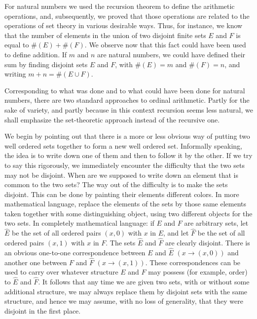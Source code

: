 
For natural numbers we used the recursion theorem to define the arithmetic operations, and, subsequently, we proved that those operations are related to the operations of set theory in various desirable ways. Thus, for instance, we know that the number of elements in the union of two disjoint finite sets $E$ and $F$ is equal to $\# (E) + \# (F)$. We observe now that this fact could have been used to define addition. If $m$ and $n$ are natural numbers, we could have defined their sum by finding disjoint sets $E$ and $F$, with $\# (E) = m$ and $\# (F) = n$, and writing $m+ n = \# (E \cup F)$.

Corresponding to what was done and to what could have been done for natural numbers, there are two standard approaches to ordinal arithmetic. Partly for the sake of variety, and partly because in this context recursion seems less natural, we shall emphasize the set-theoretic approach instead of the recursive one. 

We begin by pointing out that there is a more or less obvious way of putting two well ordered sets together to form a new well  ordered set. Informally speaking, the idea is to write down one of them and then to follow it by the other. If we try to say this rigorously, we immediately encounter the difficulty that the two sets may not be disjoint. When are we supposed to write down an element that is common to the two sets? The way out of the difficulty is to make the sets disjoint. This can be done by painting their elements different colors. In more mathematical language, replace the elements of the sets by those same elements taken together with some distinguishing object, using two different objects for the two sets. In completely mathematical language: if $E$ and $F$ are arbitrary sets, let $\hat{E}$ be the set of all ordered pairs $(x, 0)$ with $x$ in $E$, and let $\hat{F}$ be the set of all ordered pairs $(x,1)$ with $x$ in $F$. The sets $\hat{E}$ and $\hat{F}$ are clearly disjoint. There is an obvious one-to-one correspondence between $E$ and $\hat{E}$ $(x \rightarrow (x,0))$ and another one between $F$ and $\hat{F}$ $(x \rightarrow (x,1))$. These correspondences can be used to carry over whatever structure $E$ and $F$ may possess (for example, order) to $\hat{E}$ and $\hat{F}$. It follows that any time we are given two sets, with or without some additional structure, we may always replace them by disjoint sets with the same structure, and hence we may assume, with no loss of generality, that they were disjoint in the first place. 

